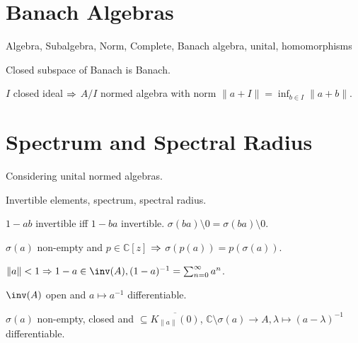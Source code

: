 \documentclass[a4paper, twocolumn, 10pt]{article}
\begin{document}
\section{Banach Algebras}

\begin{definition}
    Algebra, Subalgebra, Norm, Complete, Banach algebra, unital, homomorphisms    
\end{definition}

\begin{theorem}
    Closed subspace of Banach is Banach.
\end{theorem}

\begin{theorem}
    $I$ closed ideal $\Rightarrow$ $A/I$ normed algebra with norm $\|a + I\| = \inf_{b \in I} \|a + b\|$.
\end{theorem}

\section{Spectrum and Spectral Radius}

Considering unital normed algebras.

\begin{definition}
    Invertible elements, spectrum, spectral radius.
\end{definition}

\begin{remark}
    $1 - ab$ invertible iff $1 - ba$ invertible. $\sigma(ba) \setminus 0 = \sigma(ba) \setminus 0$.
\end{remark}

\begin{theorem}
    $\sigma(a)$ non-empty and $p \in \mathds{C}[z]$ $\Rightarrow$ $\sigma(p(a)) = p(\sigma(a))$.
\end{theorem}

\begin{theorem}
    $\|a\| < 1 \then 1 - a \in \inv(A), (1-a)^{-1} = \sum_{n=0}^\infty a^n$.
\end{theorem}

\begin{theorem}
    $\inv(A)$ open and $a \mapsto a^{-1}$ differentiable.
\end{theorem}

\begin{theorem}
    $\sigma(a)$ non-empty, closed and $\subseteq \overline{K_{\|a\|}(0)}$, $\mathds{C}\setminus \sigma(a) \to A, \lambda \mapsto (a - \lambda)^{-1}$ differentiable.
\end{theorem}
\end{document}
